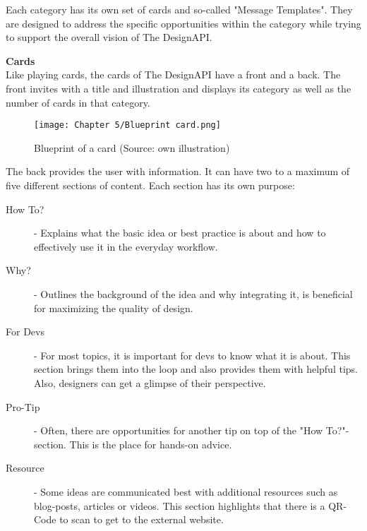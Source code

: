 Each category has its own set of cards and so-called "Message Templates". They are designed to
address the specific opportunities within the category while trying to support the overall vision of
The DesignAPI.

\textbf{Cards}\\
Like playing cards, the cards of The DesignAPI have a front and a back. The front invites with a
title and illustration and displays its category as well as the number of cards in that category.

\begin{figure}[H]
      \centering
      \texttt{[image: Chapter 5/Blueprint card.png]}
      \caption{Blueprint of a card (Source: own illustration)}
\end{figure}

The back provides the user with information. It can have two to a maximum of five different sections
of content. Each section has its own purpose:

\begin{description}
      \item[How To?] - Explains what the basic idea or best practice is about and how to
            effectively use it in the everyday workflow.

      \item[Why?] - Outlines the background of the idea and why integrating it, is beneficial for
            maximizing the quality of design.

      \item[For Devs] - For most topics, it is important for devs to know what it is about. This
            section brings them into the loop and also provides them with helpful tips. Also,
            designers can get a glimpse of their perspective.

      \item[Pro-Tip] - Often, there are opportunities for another tip on top of the "How To?"-section.
            This is the place for hands-on advice.

      \item[Resource] - Some ideas are communicated best with additional resources such as blog-posts,
            articles or videos. This section highlights that there is a QR-Code to scan to get to the
            external website.
\end{description}

